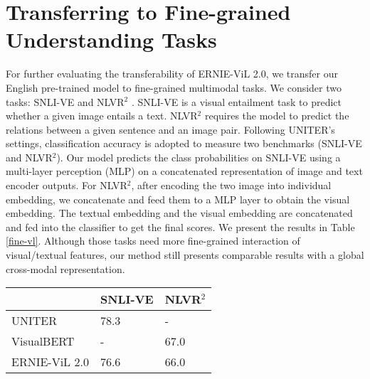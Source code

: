 \documentclass{article}
\begin{document}
\section{Transferring to Fine-grained Understanding Tasks}
\label{Transferring_fine-grained_understanding_tasks}
For further evaluating the transferability of ERNIE-ViL 2.0, we transfer our English pre-trained model to fine-grained multimodal tasks. We consider two tasks: SNLI-VE \cite{xie2019visual} and NLVR$^2$ \cite{suhr-etal-2019-corpus}. SNLI-VE is a visual entailment task to predict whether a given image entails a text. NLVR$^2$ requires the model to predict the relations between a given sentence and an image pair. Following UNITER's \cite{chen2020uniter} settings, classification accuracy is adopted to measure two benchmarks (SNLI-VE and NLVR$^2$). Our model predicts the class probabilities on SNLI-VE using a multi-layer perception (MLP) on a concatenated representation of image and text encoder outputs. 
For NLVR$^2$, after encoding the two image into individual embedding, we concatenate and feed them to a MLP layer to obtain the visual embedding. The textual embedding and the visual embedding are concatenated and fed into the classifier to get the final scores. 
We present the results in Table \ref{fine-vl}. Although those tasks need more fine-grained interaction of visual/textual features, our method still presents comparable results with a global cross-modal representation.
 \begin{table*}
\centering
\begin{tabular}{@{}l|ll@{}}
\toprule
& SNLI-VE & NLVR$^2$ \\ \midrule
UNITER          & 78.3    & -     \\
VisualBERT      & -       & 67.0  \\
ERNIE-ViL 2.0 & 76.6    & 66.0  \\ \bottomrule
\end{tabular}
\caption{Compared with previous methods with Fine-grained vision-language interaction on V+L downstream tasks: SNLI-VE and NLVR2, ERNIE-ViL 2.0 present comparable results with shallow cross-modal interaction }
\label{fine-vl}
\end{table*}
\end{document}
